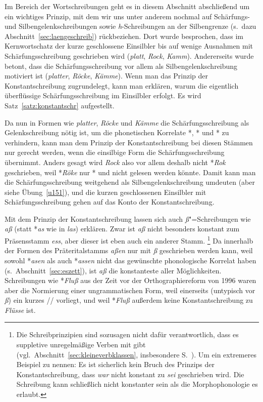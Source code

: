 Im Bereich der Wortschreibungen geht es in diesem Abschnitt abschließend um ein wichtiges Prinzip, mit dem wir uns unter anderem nochmal auf Schärfungs- und Silbengelenkschreibungen sowie \textit{h}-Schreibungen an der Silbengrenze (s.\ dazu Abschnitt~\ref{sec:laengeschreib}) rückbeziehen.
Dort wurde besprochen, dass im Kernwortschatz der kurze geschlossene Einsilbler bis auf wenige Ausnahmen mit Schärfungsschreibung geschrieben wird (\textit{platt}, \textit{Rock}, \textit{Kamm}).
Andererseits wurde betont, dass die Schärfungsschreibung vor allem als Silbengelenkschreibung motiviert ist (\textit{platter}, \textit{Röcke}, \textit{Kämme}).
Wenn man das Prinzip der Konstantschreibung zugrundelegt, kann man erklären, warum die eigentlich überflüssige Schärfungsschreibung im Einsilbler erfolgt.
Es wird Satz~\ref{satz:konstantschr} aufgestellt.


Da nun in Formen wie \textit{platter}, \textit{Röcke} und \textit{Kämme} die Schärfungsschreibung als Gelenkschreibung nötig ist, um die phonetischen Korrelate *\textipa{[pla:t5]}, *\textipa{[r\o:k@]} und *\textipa{[kE:m@]} zu verhindern, kann man dem Prinzip der Konstantschreibung bei diesen Stämmen nur gerecht werden, wenn die einsilbige Form die Schärfungsschreibung übernimmt.
Anders gesagt wird \textit{Rock} also vor allem deshalb nicht *\textit{Rok} geschrieben, weil *\textit{Röke} nur *\textipa{[r\o:k@]} und nicht \textipa{[r{\oe}\Sgel{k}@]} gelesen werden könnte.
Damit kann man die Schärfungsschreibung weitgehend als Silbengelenkschreibung umdeuten (aber siehe Übung~\ref{u151}), und die kurzen geschlossenen Einsilbler mit Schärfungsschreibung gehen auf das Konto der Konstantschreibung.

Mit dem Prinzip der Konstantschreibung lassen sich auch \textit{ß}"=Schreibungen wie \textit{aß} (statt *\textit{as} wie in \textit{las}) erklären.
Zwar ist \textit{aß} nicht besonders konstant zum Präsensstamm \textit{ess}, aber dieser ist eben auch ein anderer Stamm.%
\footnote{Die Schreibprinzipien sind sozusagen nicht dafür verantwortlich, dass es suppletive unregelmäßige Verben mit gibt (vgl.\ Abschnitt~\ref{sec:kleineverbklassen}, insbesondere S.~\pageref{abs:suppletiv}).
Um ein extremeres Beispiel zu nennen:
Es ist sicherlich kein Bruch des Prinzips der Konstantschreibung, dass \textit{war} nicht konstant zu \textit{sei} geschrieben wird.
Die Schreibung kann schließlich nicht konstanter sein als die Morphophonologie es erlaubt.}
Da innerhalb der Formen des Präteritalstamms \textit{aßen} nur mit \textit{ß} geschrieben werden kann, weil sowohl *\textit{asen} als auch *\textit{assen} nicht das gewünschte phonologische Korrelat haben (s.\ Abschnitt~\ref{sec:eszett}), ist \textit{aß} die konstanteste aller Möglichkeiten.
Schreibungen wie *\textit{Fluß} aus der Zeit vor der Orthographiereform von 1996 waren aber die Normierung einer ungrammatischen Form, weil einerseits (untypisch vor \textit{ß}) ein kurzes // vorliegt, und weil *\textit{Fluß} außerdem keine Konstantschreibung zu \textit{Flüsse} ist.


